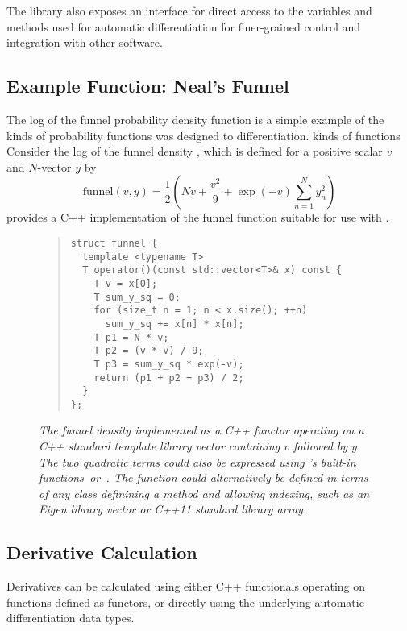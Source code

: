 \documentclass[10pt]{article}
\begin{document}
The library also exposes an interface for direct access to the
variables and methods used for automatic differentiation for
finer-grained control and integration with other software.

\subsection{Example Function: Neal's Funnel}

The log of the funnel probability density function is a simple example
of the kinds of probability functions  was designed to
differentiation.  
kinds of functions
Consider the log of the funnel density
\citep{Neal:2003}, which is defined for
a positive scalar $v$ and $N$-vector $y$ by
\[
\mbox{funnel}(v,y) = \frac{1}{2} \left(
  N v
  + \frac{v^2}{9}
  + \exp(-v) \sum_{n=1}^N y_n^2
\right)
\]
 provides a C++ implementation of the
funnel function suitable for use with .
%
\begin{figure}
\begin{quote}
\begin{Verbatim}
struct funnel {
  template <typename T>
  T operator()(const std::vector<T>& x) const {
    T v = x[0];
    T sum_y_sq = 0;
    for (size_t n = 1; n < x.size(); ++n)
      sum_y_sq += x[n] * x[n];
    T p1 = N * v;
    T p2 = (v * v) / 9;
    T p3 = sum_y_sq * exp(-v);
    return (p1 + p2 + p3) / 2;
  }
};
\end{Verbatim}
\end{quote}
\vspace*{-6pt}
\caption{\it The funnel density implemented as a C++ functor operating
  on a C++ standard template library vector containing $v$ followed by
  $y$. The two quadratic terms could also be expressed using 's
  built-in functions\,  or\, .  The function
  could alternatively be defined in terms of any class definining a
   method and allowing  indexing, such 
  as an Eigen library vector or C++11 standard library array.
}\label{funnel-cpp.figure}
\end{figure}
%


\subsection{Derivative Calculation}

Derivatives can be calculated using either C++ functionals operating
on functions defined as functors, or directly using the underlying
automatic differentiation data types.
\end{document}
